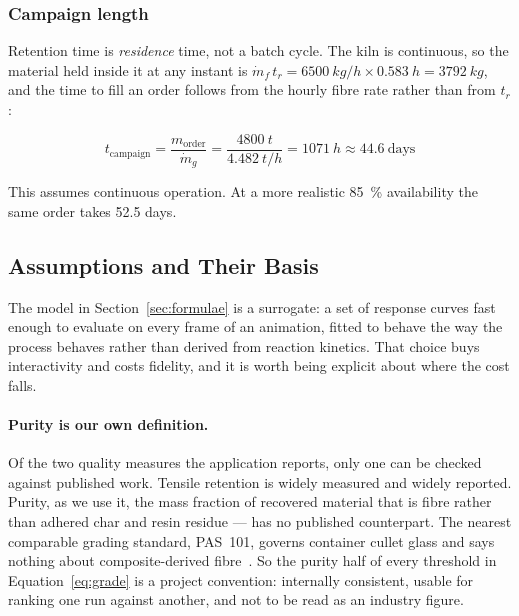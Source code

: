 \subsubsection{Campaign length}

Retention time is \emph{residence} time, not a batch cycle. The kiln is
continuous, so the material held inside it at any instant is
$\dot{m}_f \, t_r = \SI{6500}{kg/h} \times \SI{0.583}{h} = \SI{3792}{kg}$, and the time to fill an order follows from the hourly fibre rate rather than from $t_r$:

\begin{equation}
  t_{\text{campaign}} = \frac{m_{\text{order}}}{\dot{m}_g}
  = \frac{\SI{4800}{t}}{\SI{4.482}{t/h}} = \SI{1071}{h} \approx 44.6\ \text{days}
  \label{eq:campaign}
\end{equation}

This assumes continuous operation. At a more realistic \SI{85}{\%}
availability the same order takes 52.5 days.

\subsection{Assumptions and Their Basis}
\label{sec:assumptions}

The model in Section~\ref{sec:formulae} is a surrogate: a set of response curves fast enough to evaluate on every frame of an animation, fitted to behave the way the process behaves rather than derived from reaction kinetics. That choice buys interactivity and costs fidelity, and it is worth being explicit about where the cost falls.

\paragraph{Purity is our own definition.}
Of the two quality measures the application reports, only one can be checked against published work. Tensile retention is widely measured and widely reported. Purity, as we use it, the mass fraction of recovered material that is fibre rather than adhered char and resin residue --- has no published counterpart. The nearest comparable grading standard, PAS~101, governs container cullet glass and says nothing about composite-derived fibre~\cite{pas101}. So the purity half of every threshold in
Equation~\ref{eq:grade} is a project convention: internally consistent, usable for ranking one run against another, and not to be read as an industry figure.

